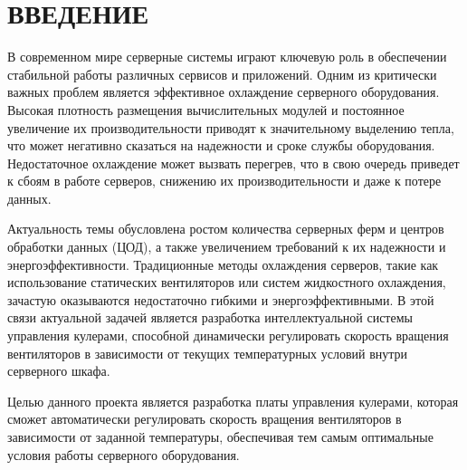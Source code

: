\chapter*{ВВЕДЕНИЕ}

В современном мире серверные системы играют ключевую роль в обеспечении стабильной работы 
различных сервисов и приложений. Одним из критически важных проблем является эффективное 
охлаждение серверного оборудования. Высокая плотность размещения вычислительных модулей и 
постоянное увеличение их производительности приводят к значительному выделению тепла, что 
может негативно сказаться на надежности и сроке службы оборудования. Недостаточное охлаждение 
может вызвать перегрев, что в свою очередь приведет к сбоям в работе серверов, снижению их 
производительности и даже к потере данных.

Актуальность темы обусловлена ростом количества серверных ферм и центров обработки данных (ЦОД), а также увеличением требований к их надежности и энергоэффективности. Традиционные методы охлаждения серверов, такие как использование статических вентиляторов или систем жидкостного охлаждения, зачастую оказываются недостаточно гибкими и энергоэффективными. В этой связи актуальной задачей является разработка интеллектуальной системы управления кулерами, способной динамически регулировать скорость вращения вентиляторов в зависимости от текущих температурных условий внутри серверного шкафа.

Целью данного проекта является разработка платы управления кулерами, которая сможет автоматически регулировать скорость вращения вентиляторов в зависимости от заданной температуры, обеспечивая тем самым оптимальные условия работы серверного оборудования.
